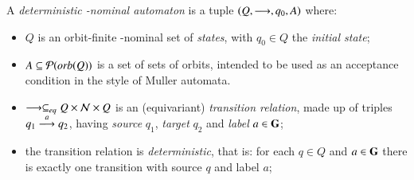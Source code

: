 %
\begin{definition}\label{def:gndma}
 A \emph{deterministic \nomG-nominal automaton} is a tuple $(Q,\overset{}{\longrightarrow},q_0,A)$ where:
 
  \begin{itemize}
  \item $Q$ is an orbit-finite \nomG-nominal set of \emph{states}, with $q_0 \in Q$ the \emph{initial state};
%  
  \item $A \subseteq \mathcal{P}(\mathit{orb}(Q))$ is a set of sets of orbits, intended to be used as an acceptance condition in the style of Muller automata.
%  
 \item $\overset{}{\longrightarrow} \subseteq_{eq} Q \times \mathcal{N} \times Q$ is an (equivariant) \emph{transition relation}, made up of triples $q_1 \overset{a}{\longrightarrow} q_2$, having \emph{source} $q_1$, \emph{target} $q_2$ and \emph{label} $a \in \mathbf{G}$;
%  
\item the transition relation is \emph{deterministic}, that is: for each $q \in Q$ and $a \in \mathbf{G}$ there is exactly one transition with source $q$ and label $a$;
%  
\end{itemize}
\end{definition}
